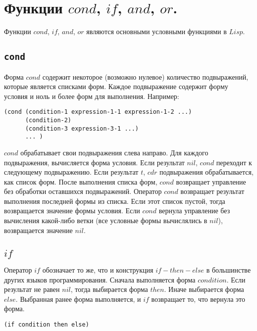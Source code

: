 \section{Функции $cond$, $if$, $and$, $or$.}
Функции $cond$, $if$, $and$, $or$ являются основными условными функциями в $Lisp$.

\subsection{\texttt{cond}}
Форма $cond$ содержит некоторое (возможно нулевое) количество подвыражений, которые является списками форм. Каждое подвыражение содержит форму условия и ноль и более форм для выполнения. Например:

\begin{code}
\begin{verbatim}
(cond (condition-1 expression-1-1 expression-1-2 ...) 
      (condition-2)
      (condition-3 expression-3-1 ...)
      ... )
\end{verbatim}
\end{code}

$cond$ обрабатывает свои подвыражения слева направо. Для каждого подвыражения, вычисляется форма условия. Если результат $nil$, $cond$ переходит к следующему подвыражению. Если результат $t$, $cdr$ подвыражения обрабатывается, как список форм. После выполнения списка форм, $cond$ возвращает управление без обработки оставшихся подвыражений. Оператор $cond$ возвращает результат выполнения последней формы из списка. Если этот список пустой, тогда возвращается значение формы условия. Если $cond$ вернула управление без вычисления какой-либо ветки (все условные формы вычислялись в $nil$), возвращается значение $nil$.

\subsection{$if$}
Оператор $if$ обозначает то же, что и конструкция $if-then-else$ в большинстве других языков программирования. Сначала выполняется форма $condition$. Если результат не равен $nil$, тогда выбирается форма $then$. Иначе выбирается форма $else$. Выбранная ранее форма выполняется, и $if$ возвращает то, что вернула это форма.

\begin{code}
\begin{verbatim}
(if condition then else)
\end{verbatim}
\end{code}


